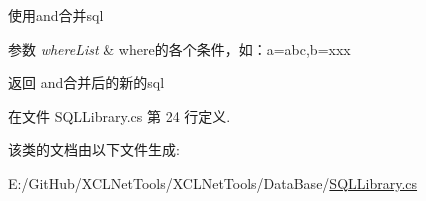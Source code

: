 使用\textquotesingle{}and\textquotesingle{}合并sql 


\begin{DoxyParams}{参数}
{\em where\+List} & where的各个条件，如：a=\textquotesingle{}abc\textquotesingle{},b=\textquotesingle{}xxx\textquotesingle{}\\
\hline
\end{DoxyParams}
\begin{DoxyReturn}{返回}
and合并后的新的sql
\end{DoxyReturn}


在文件 S\+Q\+L\+Library.\+cs 第 24 行定义.



该类的文档由以下文件生成\+:\begin{DoxyCompactItemize}
\item 
E\+:/\+Git\+Hub/\+X\+C\+L\+Net\+Tools/\+X\+C\+L\+Net\+Tools/\+Data\+Base/\hyperlink{_s_q_l_library_8cs}{S\+Q\+L\+Library.\+cs}\end{DoxyCompactItemize}
